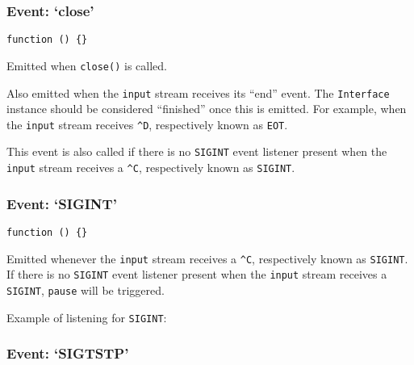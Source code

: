 \subsubsection{Event: `close'}\label{event-close}

\texttt{function () \{\}}

Emitted when \texttt{close()} is called.

Also emitted when the \texttt{input} stream receives its ``end'' event.
The \texttt{Interface} instance should be considered ``finished'' once
this is emitted. For example, when the \texttt{input} stream receives
\texttt{\^{}D}, respectively known as \texttt{EOT}.

This event is also called if there is no \texttt{SIGINT} event listener
present when the \texttt{input} stream receives a \texttt{\^{}C},
respectively known as \texttt{SIGINT}.

\subsubsection{Event: `SIGINT'}\label{event-sigint}

\texttt{function () \{\}}

Emitted whenever the \texttt{input} stream receives a \texttt{\^{}C},
respectively known as \texttt{SIGINT}. If there is no \texttt{SIGINT}
event listener present when the \texttt{input} stream receives a
\texttt{SIGINT}, \texttt{pause} will be triggered.

Example of listening for \texttt{SIGINT}:

\begin{Shaded}
\begin{Highlighting}[]
\NormalTok{(}\NormalTok{, }\NormalTok{() \{}
  \NormalTok{(}\NormalTok{, }
     \NormalTok{(}\NormalTok{(}\OtherTok{/}\FloatTok{^}\FloatTok{(}\NormalTok{)) }\NormalTok{();}
  \NormalTok{\});}
\NormalTok{\});}
\end{Highlighting}
\end{Shaded}

\subsubsection{Event: `SIGTSTP'}\label{event-sigtstp}

